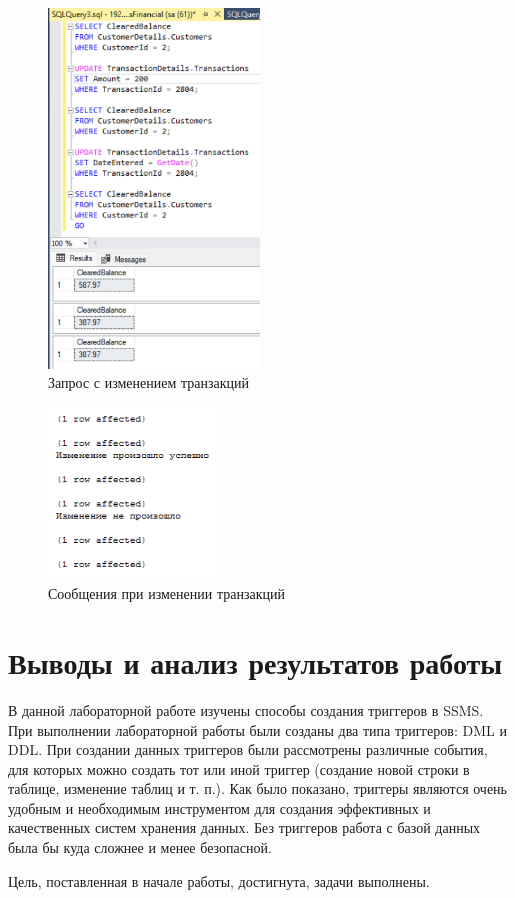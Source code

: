\documentclass[a4paper, 14pt]{extarticle}
\begin{document}
\begin{figure}[H]
  \centering
  \includegraphics[width=0.5\textwidth]{images/task-5/2.png}
  \caption{Запрос с изменением транзакций}
  \label{fig:task-5-2}
\end{figure}

\begin{figure}[H]
  \centering
  \includegraphics[width=0.4\textwidth]{images/task-5/3.png}
  \caption{Сообщения при изменении транзакций}
  \label{fig:task-5-3}
\end{figure}

\section{Выводы и анализ результатов работы}

В данной лабораторной работе изучены способы создания триггеров в SSMS. При
выполнении лабораторной работы были созданы два типа триггеров: DML и DDL. При
создании данных триггеров были рассмотрены различные события, для которых можно
создать тот или иной триггер (создание новой строки в таблице, изменение таблиц
и т. п.). Как было показано, триггеры являются очень удобным и необходимым
инструментом для создания эффективных и качественных систем хранения данных. Без
триггеров работа с базой данных была бы куда сложнее и менее безопасной.

Цель, поставленная в начале работы, достигнута, задачи выполнены.
\end{document}

